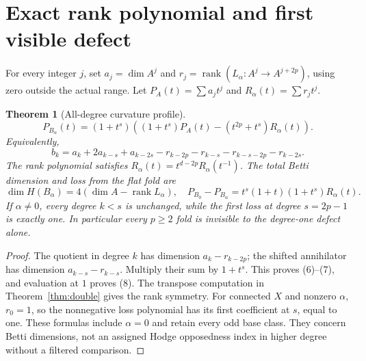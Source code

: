 \documentclass[11pt]{article}
\newtheorem{theorem}{Theorem}
\begin{document}
\section{Exact rank polynomial and first visible defect}
For every integer $j$, set $a_j=\dim A^j$ and
$r_j=\operatorname{rank}(L_\alpha:A^j\to A^{j+2p})$, using zero
outside the actual range. Let $P_A(t)=\sum a_jt^j$ and
$R_\alpha(t)=\sum r_jt^j$.
\begin{theorem}[All-degree curvature profile]\label{thm:profile}
\[
 P_{B_\alpha}(t)=(1+t^s)
 \left((1+t^s)P_A(t)-(t^{2p}+t^s)R_\alpha(t)\right).             \tag{6}
\]
Equivalently,
\[
 b_k=a_k+2a_{k-s}+a_{k-2s}
      -r_{k-2p}-r_{k-s}-r_{k-s-2p}-r_{k-2s}.                   \tag{7}
\]
The rank polynomial satisfies
$R_\alpha(t)=t^{d-2p}R_\alpha(t^{-1})$.
The total Betti dimension and loss from the flat fold are
\[
 \dim H(B_\alpha)=4(\dim A-\operatorname{rank}L_\alpha),\quad
 P_{B_0}-P_{B_\alpha}=t^s(1+t)(1+t^s)R_\alpha(t).              \tag{8}
\]
If $\alpha\ne0$, every degree $k<s$ is unchanged, while the first
loss at degree $s=2p-1$ is exactly one. In particular every $p\ge2$
fold is invisible to the degree-one defect alone.
\end{theorem}
\begin{proof}
The quotient in degree $k$ has dimension $a_k-r_{k-2p}$; the shifted
annihilator has dimension $a_{k-s}-r_{k-s}$. Multiply their sum by
$1+t^s$. This proves (6)--(7), and evaluation at $1$ proves (8).
The transpose computation in Theorem~\ref{thm:double} gives the rank
symmetry. For connected $X$ and nonzero $\alpha$, $r_0=1$, so the
nonnegative loss polynomial has its first coefficient at $s$, equal
to one. These formulas include $\alpha=0$ and retain every odd base class.
They concern Betti dimensions, not an assigned Hodge opposedness index
in higher degree without a filtered comparison.
\end{proof}
\end{document}
